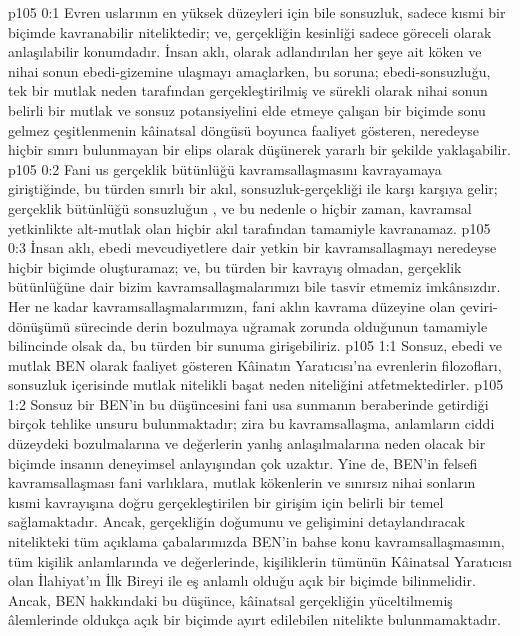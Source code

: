 \vs p105 0:1 Evren uslarının en yüksek düzeyleri için bile sonsuzluk, sadece kısmi bir biçimde kavranabilir niteliktedir; ve, gerçekliğin kesinliği sadece göreceli olarak anlaşılabilir konumdadır. İnsan aklı,  olarak adlandırılan her şeye ait köken ve nihai sonun ebedi\hyp{}gizemine ulaşmayı amaçlarken, bu soruna; ebedi\hyp{}sonsuzluğu, tek bir mutlak neden tarafından gerçekleştirilmiş ve sürekli olarak nihai sonun belirli bir mutlak ve sonsuz potansiyelini elde etmeye çalışan bir biçimde sonu gelmez çeşitlenmenin kâinatsal döngüsü boyunca faaliyet gösteren, neredeyse hiçbir sınırı bulunmayan bir elips olarak düşünerek yararlı bir şekilde yaklaşabilir.
\vs p105 0:2 Fani us gerçeklik bütünlüğü kavramsallaşmasını kavrayamaya giriştiğinde, bu türden sınırlı bir akıl, sonsuzluk\hyp{}gerçekliği ile karşı karşıya gelir; gerçeklik bütünlüğü sonsuzluğun , ve bu nedenle o hiçbir zaman, kavramsal yetkinlikte alt\hyp{}mutlak olan hiçbir akıl tarafından tamamiyle kavranamaz.
\vs p105 0:3 İnsan aklı, ebedi mevcudiyetlere dair yetkin bir kavramsallaşmayı neredeyse hiçbir biçimde oluşturamaz; ve, bu türden bir kavrayış olmadan, gerçeklik bütünlüğüne dair bizim kavramsallaşmalarımızı bile tasvir etmemiz imkânsızdır. Her ne kadar kavramsallaşmalarımızın, fani aklın kavrama düzeyine olan çeviri\hyp{}dönüşümü sürecinde derin bozulmaya uğramak zorunda olduğunun tamamiyle bilincinde olsak da, bu türden bir sunuma girişebiliriz.
\vs p105 1:1 Sonsuz, ebedi ve mutlak BEN olarak faaliyet gösteren Kâinatın Yaratıcısı’na evrenlerin filozofları, sonsuzluk içerisinde mutlak nitelikli başat neden niteliğini atfetmektedirler.
\vs p105 1:2 Sonsuz bir BEN’in bu düşüncesini fani usa sunmanın beraberinde getirdiği birçok tehlike unsuru bulunmaktadır; zira bu kavramsallaşma, anlamların ciddi düzeydeki bozulmalarına ve değerlerin yanlış anlaşılmalarına neden olacak bir biçimde insanın deneyimsel anlayışından çok uzaktır. Yine de, BEN’in felsefi kavramsallaşması fani varlıklara, mutlak kökenlerin ve sınırsız nihai sonların kısmi kavrayışına doğru gerçekleştirilen bir girişim için belirli bir temel sağlamaktadır. Ancak, gerçekliğin doğumunu ve gelişimini detaylandıracak nitelikteki tüm açıklama çabalarımızda BEN’in bahse konu kavramsallaşmasının, tüm kişilik anlamlarında ve değerlerinde, kişiliklerin tümünün Kâinatsal Yaratıcısı olan İlahiyat’ın İlk Bireyi ile eş anlamlı olduğu açık bir biçimde bilinmelidir. Ancak, BEN hakkındaki bu düşünce, kâinatsal gerçekliğin yüceltilmemiş âlemlerinde oldukça açık bir biçimde ayırt edilebilen nitelikte bulunmamaktadır.
